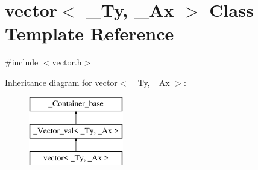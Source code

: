 \hypertarget{classvector}{\section{vector$<$ \+\_\+\+Ty, \+\_\+\+Ax $>$ Class Template Reference}
\label{classvector}
}


{\ttfamily \#include $<$vector.\+h$>$}

Inheritance diagram for vector$<$ \+\_\+\+Ty, \+\_\+\+Ax $>$\+:\begin{figure}[H]
\begin{center}
\leavevmode
\includegraphics[height=3.000000cm]{classvector}
\end{center}
\end{figure}
